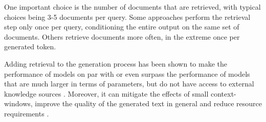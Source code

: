 One important choice is the number of documents that are retrieved, with typical choices being 3-5 documents per query.
Some approaches perform the retrieval step only once per query, conditioning the entire output on the same set of documents. Others retrieve documents more often, in the extreme once per generated token.


Adding retrieval to the generation process has been shown to make the performance of models on par with or even surpass the performance of models that are much larger in terms of parameters, but do not have access to external knowledge sources \cite{in-context}. Moreover, it can mitigate the effects of small context-windows, improve the quality of the generated text in general and reduce resource requirements \cite{Xu2023RetrievalML}.
